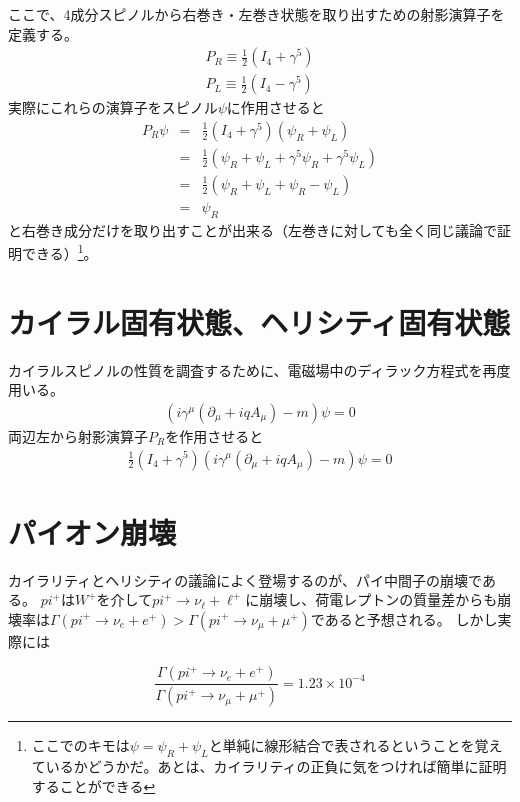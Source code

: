 ここで、4成分スピノルから右巻き・左巻き状態を取り出すための射影演算子を定義する。
\begin{eqnarray}
  P_R \equiv \frac{1}{2}(I_4+\gamma^5) \\
  P_L \equiv \frac{1}{2}(I_4-\gamma^5)
\end{eqnarray}
実際にこれらの演算子をスピノル$\psi$に作用させると
\begin{eqnarray}
  P_R\psi 
  &=& \frac{1}{2}(I_4+\gamma^5)(\psi_R+\psi_L) \\
  &=& \frac{1}{2}(\psi_R + \psi_L +\gamma^5\psi_R+ \gamma^5\psi_L) \\
  &=& \frac{1}{2}(\psi_R + \psi_L +\psi_R - \psi_L) \\
  &=& \psi_R
\end{eqnarray}
と右巻き成分だけを取り出すことが出来る（左巻きに対しても全く同じ議論で証明できる）\footnote{ここでのキモは$\psi=\psi_R + \psi_L$と単純に線形結合で表されるということを覚えているかどうかだ。あとは、カイラリティの正負に気をつければ簡単に証明することができる}。

\section{カイラル固有状態、ヘリシティ固有状態}

カイラルスピノルの性質を調査するために、電磁場中のディラック方程式を再度用いる。
\begin{eqnarray}
  \left( i\gamma^\mu(\partial_\mu + iqA_\mu) -m \right)\psi = 0
\end{eqnarray}
両辺左から射影演算子$P_R$を作用させると
\begin{eqnarray}
  \frac{1}{2}(I_4+\gamma^5)\left( i\gamma^\mu(\partial_\mu + iqA_\mu) -m \right)\psi = 0
\end{eqnarray}

\section{パイオン崩壊}
カイラリティとヘリシティの議論によく登場するのが、パイ中間子の崩壊である。
$pi^{+}$は$W^+$を介して$pi^+\to \nu_\ell + \ell^+$に崩壊し、荷電レプトンの質量差からも崩壊率は$\Gamma(pi^+\to \nu_e + e^+)>\Gamma(pi^+\to \nu_\mu + \mu^+)$であると予想される。
しかし実際には

\begin{equation}
  \frac{\Gamma(pi^+\to \nu_e + e^+)}{\Gamma(pi^+\to \nu_\mu + \mu^+)} = 1.23\times 10^{-4}
\end{equation}


